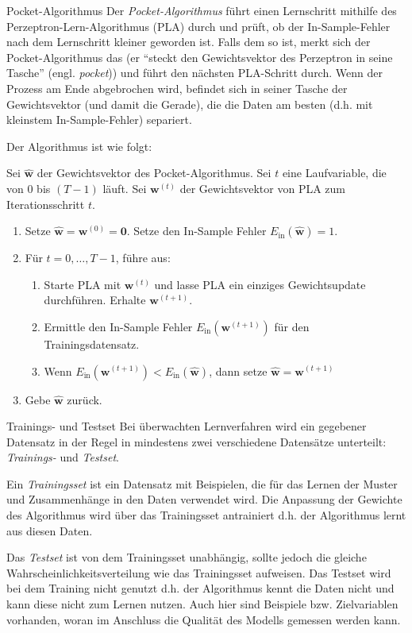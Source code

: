 \begin{defi}{Pocket-Algorithmus}
    Der \emph{Pocket-Algorithmus} führt einen Lernschritt mithilfe des Perzeptron-Lern-Algorithmus (PLA) durch und prüft, ob der In-Sample-Fehler nach dem Lernschritt kleiner geworden ist.
    Falls dem so ist, merkt sich der Pocket-Algorithmus das (er \enquote{steckt den Gewichtsvektor des Perzeptron in seine Tasche} (engl. \emph{pocket})) und führt den nächsten PLA-Schritt durch.
    Wenn der Prozess am Ende abgebrochen wird, befindet sich in seiner Tasche der Gewichtsvektor (und damit die Gerade), die die Daten am besten (d.h. mit kleinstem In-Sample-Fehler) separiert.

    Der Algorithmus ist wie folgt:

    Sei $\mathbf{\hat{w}}$ der Gewichtsvektor des Pocket-Algorithmus.
    Sei $t$ eine Laufvariable, die von $0$ bis $(T-1)$ läuft.
    Sei $\mathbf{{w}}^{(t)}$ der Gewichtsvektor von PLA zum Iterationsschritt $t$.
    \begin{enumerate}
        \item Setze $\mathbf{\hat{w}}=\mathbf{w}^{(0)}=\mathbf{0}$. Setze den In-Sample Fehler $E_{\text{in}}(\mathbf{\hat{w}}) = 1$.
        \item Für $t=0,\ldots,T-1$, führe aus:
              \begin{enumerate}
                  \item Starte PLA mit $\mathbf{w}^{(t)}$ und lasse PLA ein einziges Gewichtsupdate durchführen. Erhalte $\mathbf{w}^{(t+1)}$.
                  \item Ermittle den In-Sample Fehler $E_{\text{in}}(\mathbf{w}^{(t+1)})$ für den Trainingsdatensatz.
                  \item Wenn $E_{\text{in}}(\mathbf{w}^{(t+1)}) < E_{\text{in}}(\mathbf{\hat{w}})$, dann setze  $\mathbf{\hat{w}}=\mathbf{w}^{(t+1)}$
              \end{enumerate}
        \item Gebe $\mathbf{\hat{w}}$ zurück.
    \end{enumerate}
\end{defi}

\begin{defi}{Trainings- und Testset}
    Bei überwachten Lernverfahren wird ein gegebener Datensatz in der Regel in mindestens zwei verschiedene Datensätze unterteilt: \emph{Trainings-} und \emph{Testset}.

    Ein \emph{Trainingsset} ist ein Datensatz mit Beispielen, die für das Lernen der Muster und Zusammenhänge in den Daten verwendet wird.
    Die Anpassung der Gewichte des Algorithmus wird über das Trainingsset antrainiert d.h. der Algorithmus lernt aus diesen Daten.

    Das \emph{Testset} ist von dem Trainingsset unabhängig, sollte jedoch die gleiche Wahrscheinlichkeitsverteilung wie das Trainingsset aufweisen.
    Das Testset wird bei dem Training nicht genutzt d.h. der Algorithmus kennt die Daten nicht und kann diese nicht zum Lernen nutzen. Auch hier sind Beispiele bzw. Zielvariablen vorhanden, woran im Anschluss die Qualität des Modells gemessen werden kann.
\end{defi}


